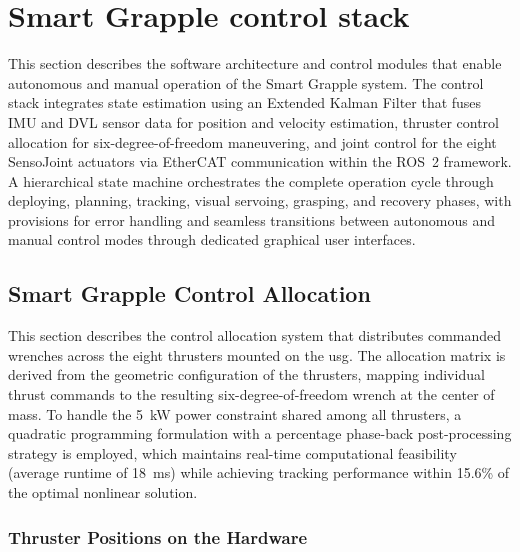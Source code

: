 \section{Smart Grapple control stack}

This section describes the software architecture and control modules that enable autonomous and manual operation of the Smart Grapple system. The control stack integrates state estimation using an Extended Kalman Filter that fuses IMU and DVL sensor data for position and velocity estimation, thruster control allocation for six-degree-of-freedom maneuvering, and joint control for the eight SensoJoint actuators via EtherCAT communication within the ROS~2 framework. A hierarchical state machine orchestrates the complete operation cycle through deploying, planning, tracking, visual servoing, grasping, and recovery phases, with provisions for error handling and seamless transitions between autonomous and manual control modes through dedicated graphical user interfaces.




\subsection{Smart Grapple Control Allocation}

This section describes the control allocation system that distributes commanded wrenches across the eight thrusters mounted on the \gls{usg}. The allocation matrix is derived from the geometric configuration of the thrusters, mapping individual thrust commands to the resulting six-degree-of-freedom wrench at the center of mass. To handle the 5~kW power constraint shared among all thrusters, a quadratic programming formulation with a percentage phase-back post-processing strategy is employed, which maintains real-time computational feasibility (average runtime of 18~ms) while achieving tracking performance within 15.6\% of the optimal nonlinear solution.


\subsubsection{Thruster Positions on the Hardware}

